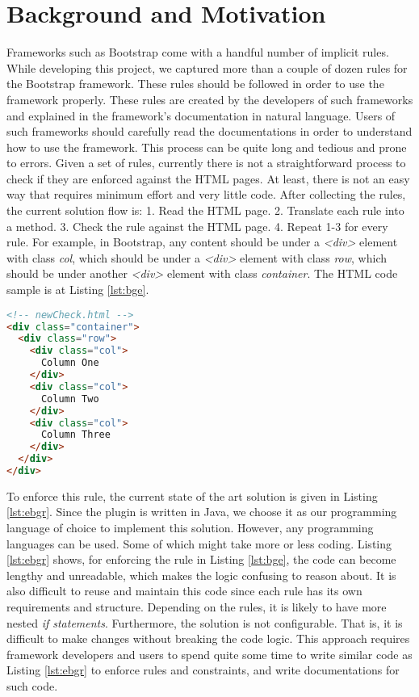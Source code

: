 \documentclass[conference]{IEEETran}
\begin{document}
\section{Background and Motivation}

Frameworks such as Bootstrap come with a handful number of implicit rules. While developing this project, we captured more than a couple of dozen rules for the Bootstrap framework. These rules should be followed in order to use the framework properly. These rules are created by the developers of such frameworks and explained in the framework’s documentation in natural language. Users of such frameworks should carefully read the documentations in order to understand how to use the framework. This process can be quite long and tedious and prone to errors. Given a set of rules, currently there is not a straightforward process to check if they are enforced against the HTML pages. At least, there is not an easy way that requires minimum effort and very little code. After collecting the rules, the current solution flow is:
1. Read the HTML page. 
2. Translate each rule into a method. 
3. Check the rule against the HTML page.
4. Repeat 1-3 for every rule.
For example, in Bootstrap, any content should be under a \textit{<div>} element with class \textit{col}, which should be under a \textit{<div>} element with class \textit{row}, which should be under another \textit{<div>} element with class \textit{container}. The HTML code sample is at Listing \ref{lst:bge}.  

\begin{lstlisting}[language=HTML, caption=Bootstrap Grid Example, label={lst:bge}]
<!-- newCheck.html -->
<div class="container">
  <div class="row">
    <div class="col">
      Column One
    </div>
    <div class="col">
      Column Two
    </div>
    <div class="col">
      Column Three
    </div>
  </div>
</div>
\end{lstlisting}

To enforce this rule, the current state of the art solution is given in Listing \ref{lst:ebgr}. Since the plugin is written in Java, we choose it as our programming language of choice to implement this solution. However, any programming languages can be used. Some of which might take more or less coding. Listing \ref{lst:ebgr} shows, for enforcing the rule in Listing \ref{lst:bge}, the code can become lengthy and unreadable, which makes the logic confusing to reason about. It is also difficult to reuse and maintain this code since each rule has its own requirements and structure. Depending on the rules, it is likely to have more nested \textit{if statements}. Furthermore, the solution is not configurable. That is, it is difficult to make changes without breaking the code logic. This approach requires framework developers and users to spend quite some time to write similar code as Listing \ref{lst:ebgr} to enforce rules and constraints, and write documentations for such code.   
\end{document}
